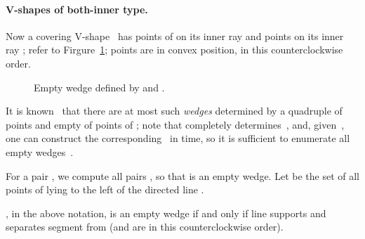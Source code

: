 \documentclass{llncs}
\begin{document}
\paragraph{V-shapes of both-inner type.}
Now a covering V-shape~ has points  of  on its inner ray
 and points  on its inner ray ; refer to Firgure~\ref{V4}; 
points  are in convex position, in this counterclockwise order.  
\begin{figure}
\centering
{}
\caption{Empty wedge defined by  and .}
\label{V4}
\end{figure}
It is known~\cite{EmptyPolygons} that there are at most  such
\emph{wedges}  determined by a quadruple of points
 and empty of points of ; note that  completely
determines~, and, given~, one can construct the
corresponding~ in  time,
so it is sufficient to enumerate all empty wedges~.







For a pair , we compute all pairs , so that
 is an empty wedge.  
Let  be the set of all points of  lying to the left of
the directed line .  


\begin{observation}
  , in the above notation, is an empty wedge if and only
  if line  supports  and separates segment 
  from  (and  are in this counterclockwise order).
\end{observation}
\end{document}
